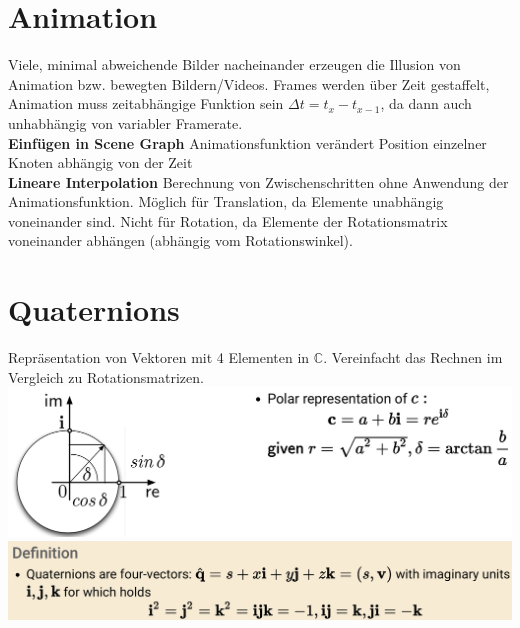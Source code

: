 \documentclass[12pt]{article}
\newcommand{\C}{\mathbb{C}}
\begin{document}
	\section{Animation}
	Viele, minimal abweichende Bilder nacheinander erzeugen die Illusion von Animation bzw. bewegten Bildern/Videos. Frames werden über Zeit gestaffelt, Animation muss zeitabhängige Funktion sein $\Delta t = t_x - t_{x-1}$, da dann auch unhabhängig von variabler Framerate.\\
	\textbf{Einfügen in Scene Graph} Animationsfunktion verändert Position einzelner Knoten abhängig von der Zeit\\
	\textbf{Lineare Interpolation} Berechnung von Zwischenschritten ohne Anwendung der Animationsfunktion. Möglich für Translation, da Elemente unabhängig voneinander sind. Nicht für Rotation, da Elemente der Rotationsmatrix voneinander abhängen (abhängig vom Rotationswinkel).

	\section{Quaternions}
	Repräsentation von Vektoren mit 4 Elementen in $\C$. Vereinfacht das Rechnen im Vergleich zu Rotationsmatrizen.\\
	\includegraphics[width=\linewidth]{figures/2d-complex-coordinates.png}\\
	\includegraphics[width=\linewidth]{figures/quaternions.png}
\end{document}
